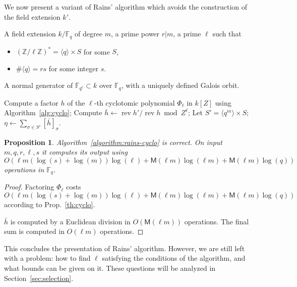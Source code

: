 \documentclass[12pt]{article}
\theoremstyle{plain}
\newtheorem{proposition}[theorem]{Proposition}
\theoremstyle{definition}
\DeclareMathOperator{\rev}{rev}
\def\Z{\ensuremath{\mathbb{Z}}}
\def\F{\ensuremath{\mathbb{F}}}
\def\MM{\ensuremath{\mathsf{M}}}
\newcounter{algorithm}
\begin{document}
We now present a variant of Rains' algorithm which avoids the
construction of the field extension $k'$. 

\begin{algorithm}
  \label{algorithm:rains-cyclo-2}
  \begin{algorithmic}[1]
    \REQUIRE A field extension $k/\F_q$ of degree $m$, a prime power
    $r|m$, a prime $\ell$ such that
    \begin{itemize}
    \item $(\Z/\ell\Z)^\ast = \langle q\rangle \times S$ for some $S$,
    \item $\#\langle q\rangle = rs$ for some integer $s$.
    \end{itemize}
    \ENSURE A normal generator of $\F_{q^r}\subset k$ over $\F_q$,
    with a uniquely defined Galois orbit.
    
    \STATE Compute a factor $h$ of the $\ell$-th cyclotomic polynomial $\Phi_\ell$ in $k[Z]$ using Algorithm~\ref{alg:cyclo}; 
    \STATE Compute $\bar{h} \leftarrow \rev{h'}/\rev{h} \bmod Z^\ell$;
    \STATE Let $S' = \langle q^m\rangle \times S$;
    \RETURN\label{algorithm:rains-cyclo:period} $\eta \leftarrow \sum_{\sigma\in S'}[\bar{h}]_\sigma$.
  \end{algorithmic}
\end{algorithm}


\begin{proposition}
  Algorithm~\ref{algorithm:rains-cyclo} is correct. On input
  $m,q,r,\ell,s$ it computes its output using $O(\ell
  m(\log(s)+\log(m))\log(\ell) + \MM(\ell m)\log(\ell m) + \MM(\ell
  m)\log(q))$ operations in $\F_q$.
\end{proposition}
\begin{proof}
  Factoring $\Phi_\ell$ costs $O(\ell m(\log(s)+\log(m))\log(\ell) +
  \MM(\ell m)\log(\ell m) + \MM(\ell m)\log(q))$ according to
  Prop.~\ref{th:cyclo}.

  $\bar{h}$ is computed by a Euclidean division in $O(\MM(\ell m))$
  operations. The final sum is computed in $O(\ell m)$ operations.
\end{proof}


This concludes the presentation of Rains' algorithm. However, we are
still left with a problem: how to find $\ell$ satisfying the
conditions of the algorithm, and what bounds can be given on it. These
questions will be analyzed in Section~\ref{sec:selection}.
\end{document}
